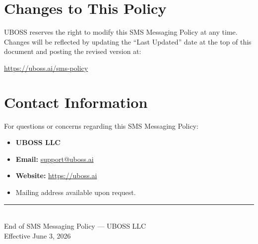 \documentclass[11pt]{article}
\begin{document}
\section{Changes to This Policy}

UBOSS reserves the right to modify this SMS Messaging Policy at any time. Changes will be reflected by updating the ``Last Updated'' date at the top of this document and posting the revised version at:

\begin{center}
    \url{https://uboss.ai/sms-policy}
\end{center}

\section{Contact Information}

For questions or concerns regarding this SMS Messaging Policy:

\begin{itemize}[leftmargin=2em]
    \item \textbf{UBOSS LLC}
    \item \textbf{Email:} \href{mailto:support@uboss.ai}{support@uboss.ai}
    \item \textbf{Website:} \url{https://uboss.ai}
    \item Mailing address available upon request.
\end{itemize}

\vspace{2em}

\begin{center}
    \rule{0.5\textwidth}{0.4pt}\\[0.5em]
    {\small End of SMS Messaging Policy --- UBOSS LLC\\
    Effective June 3, 2026}
\end{center}
\end{document}
